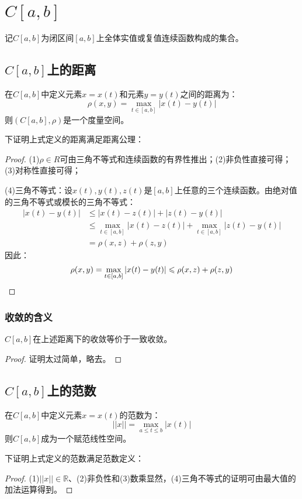 \section{$C[a,b]$}

\begin{definition}
	记$C[a,b]$为闭区间$[a,b]$上全体实值或复值连续函数构成的集合。
\end{definition}

\subsection{$C[a,b]$上的距离}
\begin{definition}
	在$C[a,b]$中定义元素$x=x(t)$和元素$y=y(t)$之间的距离为：
	\begin{equation*}
		\rho(x,y)=\max_{t\in[a,b]}|x(t)-y(t)|
	\end{equation*}
	则$(C[a,b],\rho)$是一个度量空间。
\end{definition}
下证明上式定义的距离满足距离公理：
\begin{proof}
	(1)$\rho\in R$可由三角不等式和连续函数的有界性推出；(2)非负性直接可得；(3)对称性直接可得；\par
	(4)三角不等式：设$x(t),y(t),z(t)$是$[a,b]$上任意的三个连续函数。由绝对值的三角不等式或模长的三角不等式：
	\begin{align*}
		|x(t)-y(t)|&\leqslant|x(t)-z(t)|+|z(t)-y(t)| \\
		&\leqslant\max_{t\in[a,b]}|x(t)-z(t)|+\max_{t\in[a,b]}|z(t)-y(t)| \\
		&=\rho(x,z)+\rho(z,y)
	\end{align*}
	因此：
	\begin{equation*}
		\rho(x,y)=\max_{t\in[a,b]}|x(t)-y(t)|\leqslant\rho(x,z)+\rho(z,y)\qedhere
	\end{equation*}
\end{proof}
\subsubsection{收敛的含义}
\begin{theorem}
	$C[a,b]$在上述距离下的收敛等价于一致收敛。
\end{theorem}
\begin{proof}
	证明太过简单，略去。
\end{proof}

\subsection{$C[a,b]$上的范数}
\begin{definition}
	在$C[a,b]$中定义元素$x=x(t)$的范数为：
	\begin{equation*}
		||x||=\max_{a\leqslant t\leqslant b}|x(t)|
	\end{equation*}
	则$C[a,b]$成为一个赋范线性空间。
\end{definition}
下证明上式定义的范数满足范数定义：
\begin{proof}
	(1)$||x||\in\mathbb{R}$、(2)非负性和(3)数乘显然，(4)三角不等式的证明可由最大值的加法运算得到。
\end{proof}
